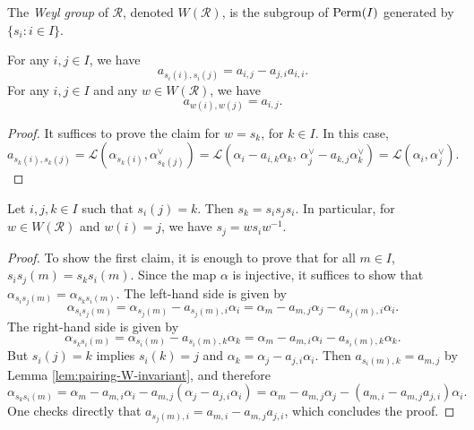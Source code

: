 \begin{definition}\label{def:WeylGroup}
    The {\it Weyl group} of $\mathcal{R}$, denoted $W(\mathcal{R})$, is the subgroup of ${\rm Perm}(I)$ 
    generated by $\{s_i : i \in I\}$. 
\end{definition}

\begin{lemma}\label{lem:pairing-W-invariant}
\leanok
    For any $i,j \in I$, we have 
    \[
        a_{s_i(i),s_i(j)} = a_{i,j} - a_{j,i}a_{i,i}.
    \]
    For any $i,j \in I$ and any $w \in W(\mathcal{R})$, we have 
    \[
        a_{w(i),w(j)} = a_{i,j}.
    \]
\end{lemma}
\begin{proof}
    It suffices to prove the claim for $w = s_k$, for $k \in I$. In this case, 
    \begin{equation*}
        a_{s_k(i),s_k(j)} = \mathcal{L}(\alpha_{s_k(i)},\alpha^\vee_{s_k(j)})
        = \mathcal{L}(\alpha_{i} - a_{i,k}\alpha_k,\, \alpha^\vee_{j} - a_{k,j} \alpha_k^\vee)
         = \mathcal{L}(\alpha_{i},\alpha^\vee_{j}).
    \end{equation*}
\end{proof}

\begin{lemma}\label{lem:si_are_reflections}
    Let $i,j,k \in I$ such that $s_i(j) = k$. Then $s_k = s_is_js_i$. In particular, for 
    $w \in W(\mathcal{R})$ and $w(i) = j$, we have $s_j = ws_iw^{-1}$. 
\end{lemma}
\begin{proof}
To show the first claim, it is enough to prove that for all $m \in I$, $s_is_j(m) = s_ks_i(m)$. Since the map $\alpha$ is injective, it suffices to show that  $\alpha_{s_is_j(m)} = \alpha_{s_ks_i(m)}$. The left-hand side is given by
\begin{equation*}
    \alpha_{s_is_j(m)} = \alpha_{s_j(m)} - a_{s_j(m),i}\alpha_i = \alpha_m - a_{m,j}\alpha_j - a_{s_j(m),i}\alpha_i.
\end{equation*}
The right-hand side is given by
\begin{equation*}
    \alpha_{s_ks_i(m)} = \alpha_{s_i(m)} - a_{s_i(m),k}\alpha_k = \alpha_m - a_{m,i}\alpha_i - a_{s_i(m),k}\alpha_k.
\end{equation*}
But $s_i(j) = k$ implies $s_i(k) = j$ and  $\alpha_k = \alpha_j - a_{j,i}\alpha_i$. Then $a_{s_i(m),k} = a_{m,j}$ by Lemma \ref{lem:pairing-W-invariant}, and therefore
\begin{equation*}
    \alpha_{s_ks_i(m)} = \alpha_m - a_{m,i}\alpha_i - a_{m,j}(\alpha_j - a_{j,i}\alpha_i) = \alpha_m  - a_{m,j}\alpha_j - (a_{m,i} - a_{m,j}a_{j,i})\alpha_i.
\end{equation*}
One checks directly that $a_{s_j(m),i} = a_{m,i}-a_{m,j}a_{j,i}$, which concludes the proof. 
\end{proof}
